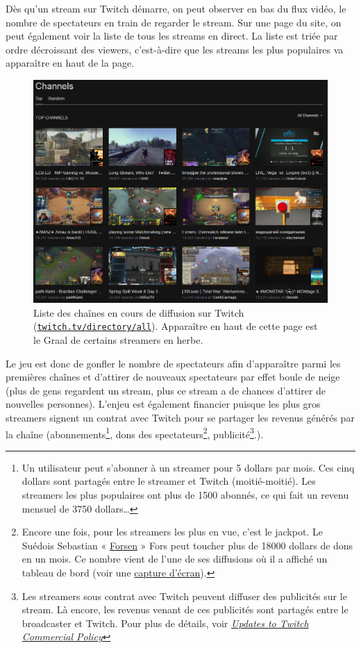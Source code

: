 \documentclass[a4paper]{article}
\begin{document}
Dès qu'un stream sur Twitch démarre, on peut observer en bas du flux vidéo, le nombre de spectateurs en train de regarder le stream. Sur une page du site, on peut également voir la liste de tous les streams en direct. La liste est triée par ordre décroissant des viewers, c'est-à-dire que les streams les plus populaires va apparaître en haut de la page.

\begin{figure}[!h]
	\centering
	\includegraphics[height=8.5cm]{channels.png}
	\caption{Liste des chaînes en cours de diffusion sur Twitch (\href{https://www.twitch.tv/directory/all}{\texttt{twitch.tv/directory/all}}). Apparaître en haut de cette page est le Graal de certains streamers en herbe.}
\end{figure}

Le jeu est donc de gonfler le nombre de spectateurs afin d'apparaître parmi les premières chaînes et d'attirer de nouveaux spectateurs par effet boule de neige (plus de gens regardent un stream, plus ce stream a de chances d'attirer de nouvelles personnes). L'enjeu est également financier puisque les plus gros streamers signent un contrat avec Twitch pour se partager les revenus générés par la chaîne (abonnements\footnote{Un utilisateur peut s'abonner à un streamer pour 5 dollars par mois. Ces cinq dollars sont partagés entre le streamer et Twitch (moitié-moitié). Les streamers les plus populaires ont plus de 1500 abonnés, ce qui fait un revenu mensuel de 3750 dollars\ldots}, dons des spectateurs\footnote{Encore une fois, pour les streamers les plus en vue, c'est le jackpot. Le Suédois Sebastian « \href{https://www.twitch.tv/forsenlol}{Forsen} » Fors peut toucher plus de 18000 dollars de dons en un mois. Ce nombre vient de l'une de ses diffusions où il a affiché un tableau de bord (voir une \href{http://imgur.com/gallery/OLyQNpk}{capture d'écran}).}, publicité\footnote{Les streamers sous contrat avec Twitch peuvent diffuser des publicités sur le stream. Là encore, les revenus venant de ces publicités sont partagés entre le broadcaster et Twitch. Pour plus de détails, voir \href{https://blog.twitch.tv/updates-to-twitch-commercial-policy-a35f5ce89afa}{\textit{Updates to Twitch Commercial Policy}}}.).
\end{document}
